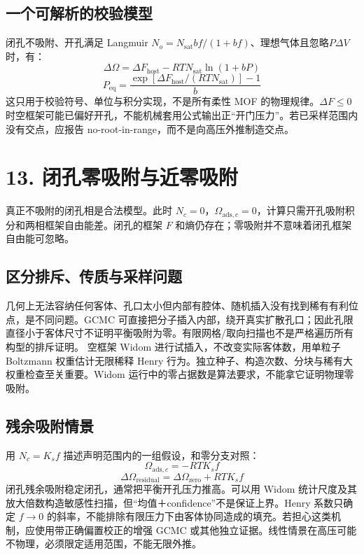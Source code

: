 \documentclass[UTF8,a4paper,11pt]{ctexart}
\begin{document}
\subsection*{一个可解析的校验模型}
闭孔不吸附、开孔满足 Langmuir \(N_o=N_{\mathrm{sat}}bf/(1+bf)\)、理想气体且忽略\(P\Delta V\) 时，有：
\begin{equation*}
\Delta\Omega=\Delta F_{\mathrm{host}}-RTN_{\mathrm{sat}}\ln(1+bP)
\end{equation*}
\begin{equation*}
P_{\mathrm{eq}}=\frac{\exp\left[\Delta F_{\mathrm{host}}/(RTN_{\mathrm{sat}})\right]-1}{b}
\end{equation*}
这只用于校验符号、单位与积分实现，不是所有柔性 MOF 的物理规律。\(\Delta F\le0\)时空框架可能已偏好开孔，不能机械套用公式输出正“开门压力”。若已采样范围内没有交点，应报告 no-root-in-range，而不是向高压外推制造交点。
\clearpage
\section*{13. 闭孔零吸附与近零吸附}
真正不吸附的闭孔相是合法模型。此时 \(N_c=0\)，\(\Omega_{\mathrm{ads},c}=0\)，计算只需开孔吸附积分和两相框架自由能差。闭孔的框架 \(F\) 和熵仍存在；零吸附并不意味着闭孔框架自由能可忽略。
\subsection*{区分排斥、传质与采样问题}
几何上无法容纳任何客体、孔口太小但内部有腔体、随机插入没有找到稀有有利位点，是不同问题。GCMC 可直接把分子插入内部，绕开真实扩散孔口；因此孔限直径小于客体尺寸不证明平衡吸附为零。有限网格/取向扫描也不是严格遍历所有构型的排斥证明。
空框架 Widom 进行试插入，不改变实际客体数，用单粒子 Boltzmann 权重估计无限稀释 Henry 行为。独立种子、构造次数、分块与稀有大权重检查至关重要。Widom 运行中的零占据数是算法要求，不能拿它证明物理零吸附。
\subsection*{残余吸附情景}
用 \(N_c=K_s f\) 描述声明范围内的一组假设，和零分支对照：
\begin{equation*}
\Omega_{\mathrm{ads},c}=-RTK_s f
\end{equation*}
\begin{equation*}
\Delta\Omega_{\mathrm{residual}}=\Delta\Omega_{\mathrm{zero}}+RTK_s f
\end{equation*}
闭孔残余吸附稳定闭孔，通常把平衡开孔压力推高。可以用 Widom 统计尺度及其放大倍数构造敏感性扫描，但“均值＋confidence”不是保证上界。Henry 系数只确定 \(f\to0\) 的斜率，不能排除有限压力下由客体协同造成的填充。若担心这类机制，应使用带正确偏置校正的增强 GCMC 或其他独立证据。线性情景在高压可能不物理，必须限定适用范围，不能无限外推。
\clearpage
\end{document}
